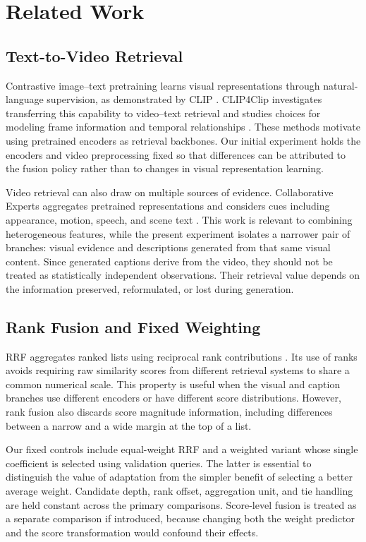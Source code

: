\section{Related Work}

\subsection{Text-to-Video Retrieval}

Contrastive image--text pretraining learns visual representations through natural-language supervision, as demonstrated by CLIP \cite{radford2021clip}. CLIP4Clip investigates transferring this capability to video--text retrieval and studies choices for modeling frame information and temporal relationships \cite{luo2021clip4clip}. These methods motivate using pretrained encoders as retrieval backbones. Our initial experiment holds the encoders and video preprocessing fixed so that differences can be attributed to the fusion policy rather than to changes in visual representation learning.

Video retrieval can also draw on multiple sources of evidence. Collaborative Experts aggregates pretrained representations and considers cues including appearance, motion, speech, and scene text \cite{liu2019experts}. This work is relevant to combining heterogeneous features, while the present experiment isolates a narrower pair of branches: visual evidence and descriptions generated from that same visual content. Since generated captions derive from the video, they should not be treated as statistically independent observations. Their retrieval value depends on the information preserved, reformulated, or lost during generation.

\subsection{Rank Fusion and Fixed Weighting}

RRF aggregates ranked lists using reciprocal rank contributions \cite{cormack2009rrf}. Its use of ranks avoids requiring raw similarity scores from different retrieval systems to share a common numerical scale. This property is useful when the visual and caption branches use different encoders or have different score distributions. However, rank fusion also discards score magnitude information, including differences between a narrow and a wide margin at the top of a list.

Our fixed controls include equal-weight RRF and a weighted variant whose single coefficient is selected using validation queries. The latter is essential to distinguish the value of adaptation from the simpler benefit of selecting a better average weight. Candidate depth, rank offset, aggregation unit, and tie handling are held constant across the primary comparisons. Score-level fusion is treated as a separate comparison if introduced, because changing both the weight predictor and the score transformation would confound their effects.

